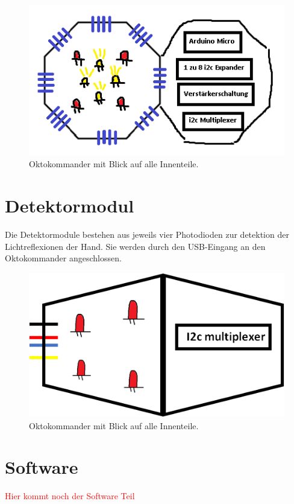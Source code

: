 \documentclass{sciposter}
\begin{document}
\begin{multicols}{3}
\begin{figure}[h]
	\centering
	\includegraphics[scale=1.3]{figures/OktokommanderOffen.png}
	\caption{Oktokommander mit Blick auf alle Innenteile.}
	\label{fig:Sensorhandschuh}
\end{figure}

\section{Detektormodul}
Die Detektormodule bestehen aus jeweils vier Photodioden zur detektion der Lichtreflexionen der Hand. Sie werden durch den USB-Eingang an den Oktokommander angeschlossen. 

\begin{figure}[h]
	\centering
	\includegraphics[scale=1.3]{figures/DetektormodulOffen.png}
	\caption{Oktokommander mit Blick auf alle Innenteile.}
	\label{fig:Sensorhandschuh}
\end{figure}

\section{Software}
\textcolor{red}{Hier kommt noch der Software Teil}


\end{multicols}
\end{document}
